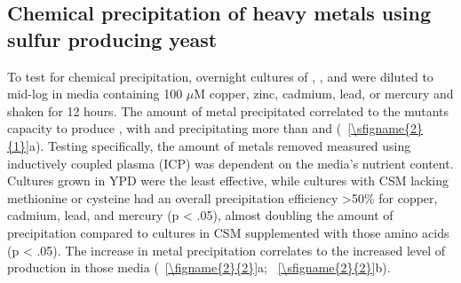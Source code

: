 \documentclass[../main/main]{subfiles}
\begin{document}
\subsection{Chemical precipitation of heavy metals using sulfur producing yeast}
To test for chemical precipitation, overnight cultures of , ,  and  were diluted to mid-log in media containing 100 $\mu$M copper, zinc, cadmium, lead, or mercury and shaken for 12 hours. The amount of metal precipitated correlated to the mutants capacity to produce \HS{}, with  and  precipitating more than  and  (\sFIGURE~\ref{\sfigname{2}{1}}a). Testing  specifically, the amount of metals removed measured using inductively coupled plasma (ICP) was dependent on the media's nutrient content. Cultures grown in YPD were the least effective, while cultures with CSM lacking methionine or cysteine had an overall precipitation efficiency >50\% for copper, cadmium, lead, and mercury (p < .05), almost doubling the amount of precipitation compared to cultures in CSM supplemented with those amino acids (p < .05).
The increase in metal precipitation correlates to the increased level of \HS{} production in those media (\FIGURE~\ref{\figname{2}{2}}a; \sFIGURE~\ref{\sfigname{2}{2}}b).
\end{document}
